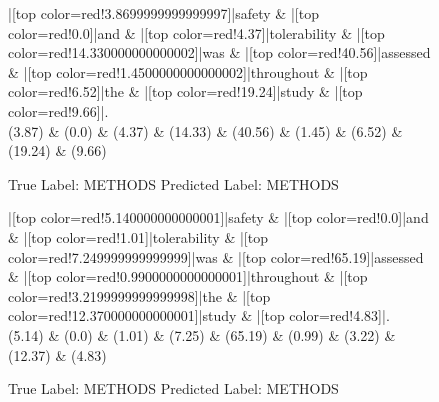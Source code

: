 \documentclass[a4paper, landscape]{article}
\begin{document}
\clearpage
\begin{figure}
\begin{center}
\begin{dependency}
\begin{deptext}
|[top color=red!3.8699999999999997]|safety \& |[top color=red!0.0]|and \& |[top color=red!4.37]|tolerability \& |[top color=red!14.330000000000002]|was \& |[top color=red!40.56]|assessed \& |[top color=red!1.4500000000000002]|throughout \& |[top color=red!6.52]|the \& |[top color=red!19.24]|study \& |[top color=red!9.66]|.\\
(3.87) \& (0.0) \& (4.37) \& (14.33) \& (40.56) \& (1.45) \& (6.52) \& (19.24) \& (9.66)\\
\end{deptext}
\end{dependency}
\end{center}
\caption{True Label: METHODS Predicted Label: METHODS}
\end{figure}
\clearpage
\begin{figure}
\begin{center}
\begin{dependency}
\begin{deptext}
|[top color=red!5.140000000000001]|safety \& |[top color=red!0.0]|and \& |[top color=red!1.01]|tolerability \& |[top color=red!7.249999999999999]|was \& |[top color=red!65.19]|assessed \& |[top color=red!0.9900000000000001]|throughout \& |[top color=red!3.2199999999999998]|the \& |[top color=red!12.370000000000001]|study \& |[top color=red!4.83]|.\\
(5.14) \& (0.0) \& (1.01) \& (7.25) \& (65.19) \& (0.99) \& (3.22) \& (12.37) \& (4.83)\\
\end{deptext}
\end{dependency}
\end{center}
\caption{True Label: METHODS Predicted Label: METHODS}
\end{figure}
\end{document}
